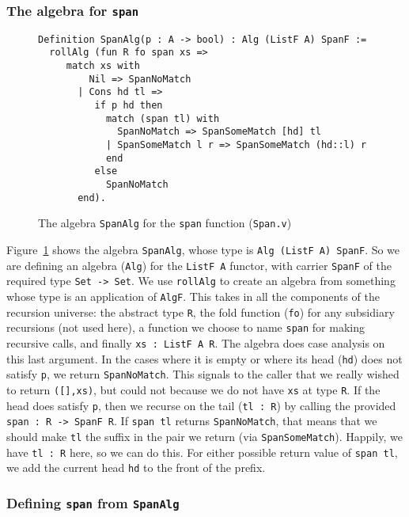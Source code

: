 \documentclass[a4paper,USenglish]{lipics-v2021}
\begin{document}
\subsubsection{The algebra for \texttt{span}}


\begin{figure}
\begin{verbatim}
Definition SpanAlg(p : A -> bool) : Alg (ListF A) SpanF :=
  rollAlg (fun R fo span xs =>
     match xs with
         Nil => SpanNoMatch
       | Cons hd tl =>
          if p hd then
            match (span tl) with
              SpanNoMatch => SpanSomeMatch [hd] tl
            | SpanSomeMatch l r => SpanSomeMatch (hd::l) r
            end
          else
            SpanNoMatch
       end).
\end{verbatim}
\caption{The algebra \texttt{SpanAlg} for the \texttt{span} function (\texttt{Span.v})}
\label{fig:spanalg}
\end{figure}

Figure~\ref{fig:spanalg} shows the algebra \verb|SpanAlg|, whose type
is \verb|Alg (ListF A) SpanF|.  So we are defining an algebra
(\verb|Alg|) for the \verb|ListF A| functor, with carrier \verb|SpanF|
of the required type \verb|Set -> Set|.  We use \verb|rollAlg| to
create an algebra from something whose type is an application of
\verb|AlgF|.  This takes in all the components of the recursion
universe: the abstract type \verb|R|, the fold function (\verb|fo|)
for any subsidiary recursions (not used here), a function we choose to
name \verb|span| for making recursive calls, and finally
\verb|xs : ListF A R|.  The algebra does case analysis on this last
argument.  In the cases where it is empty or where its head
(\verb|hd|) does not satisfy \verb|p|, we return \verb|SpanNoMatch|.
This signals to the caller that we really wished to return
\verb|([],xs)|, but could not because we do not have \verb|xs| at type
\verb|R|.  If the head does satisfy \verb|p|, then we recurse on the
tail (\verb|tl : R|) by calling the provided
\verb|span : R -> SpanF R|.  If \verb|span tl| returns
\verb|SpanNoMatch|, that means that we should make \verb|tl| the
suffix in the pair we return (via \verb|SpanSomeMatch|).  Happily, we
have \verb|tl : R| here, so we can do this.  For either possible
return value of \verb|span tl|, we add the current head \verb|hd| to
the front of the prefix.

\subsubsection{Defining \texttt{span} from \texttt{SpanAlg}}
\end{document}
